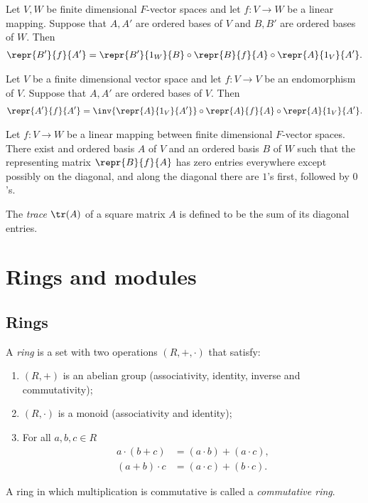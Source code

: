 \documentclass{article}
\begin{document}
\begin{theorem}[Notes 2.4.3]
	Let $V,W$ be finite dimensional $F$-vector spaces and let $f:V\to W$ be a linear mapping.
	Suppose that $A,A'$ are ordered bases of $V$ and $B,B'$ are ordered bases of $W$. Then
	\begin{align*}
		\repr{B'}{f}{A'} = \repr{B'}{1_W}{B}\circ\repr{B}{f}{A}\circ\repr{A}{1_V}{A'}.
	\end{align*}
\end{theorem}

\begin{corollary}[Notes 2.4.4]
	Let $V$ be a finite dimensional vector space and let $f:V\to V$ be an endomorphism of $V$.
	Suppose that $A,A'$ are ordered bases of $V$. Then
	\begin{align*}
		\repr{A'}{f}{A'}=\inv{\repr{A}{1_V}{A'}}\circ\repr{A}{f}{A}\circ\repr{A}{1_V}{A'}.
	\end{align*}
\end{corollary}

\begin{theorem}[Notes 2.4.5]
	Let $f:V\to W$ be a linear mapping between finite dimensional $F$-vector spaces. There exist
	and ordered basis $A$ of $V$ and an ordered basis $B$ of $W$ such that the representing matrix
	$\repr{B}{f}{A}$ has zero entries everywhere except possibly on the diagonal, and along the
	diagonal there are $1$'s first, followed by $0$'s.
\end{theorem}

\begin{definition}
	The \emph{trace} $\tr(A)$ of a square matrix $A$ is defined to be the sum of its diagonal entries.
\end{definition}

\section{Rings and modules}

\subsection{Rings}

\begin{definition}
	A \emph{ring} is a set with two operations $(R,+,\cdot)$ that satisfy:
	\begin{enumerate}
		\item $(R,+)$ is an abelian group (associativity, identity, inverse and commutativity);
		\item $(R,\cdot)$ is a monoid (associativity and identity);
		\item For all $a,b,c\in R$ \begin{align*}
			      a\cdot (b+c) & = (a\cdot b) + (a\cdot c), \\
			      (a+b)\cdot c & = (a\cdot c) + (b\cdot c).
		      \end{align*}
	\end{enumerate}
	A ring in which multiplication is commutative is called a \emph{commutative ring}.
\end{definition}
\end{document}
